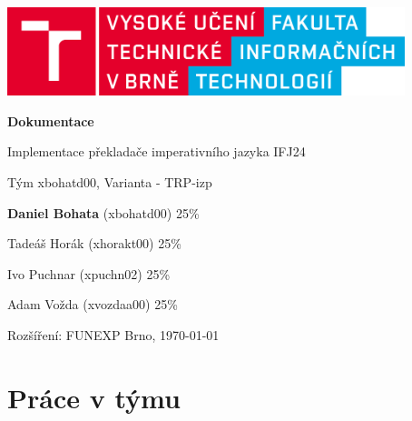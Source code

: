 \documentclass[a4paper, 12pt]{article}
\begin{document}
    \begin{titlepage}
        \begin{center}
            \includegraphics[width=0.87\textwidth]{images/logo_cz.png}
            \vspace*{6cm}

            \Huge{\textbf{Dokumentace}}
            \vspace{0.5cm}
            
            \LARGE{Implementace překladače imperativního jazyka IFJ24}
            \vspace{0.5cm}
            
            \Large{Tým xbohatd00, Varianta - TRP-izp}
            \vspace{2.5cm}
            
            \large{\textbf{Daniel Bohata} (xbohatd00) 25\%}
            \vspace{0.1cm}
            
            \large{Tadeáš Horák (xhorakt00) 25\%}
            \vspace{0.1cm}
            
            \large{Ivo Puchnar (xpuchn02) 25\%}
            \vspace{0.1cm}
            
            \large{Adam Vožda (xvozdaa00) 25\%}
            \vspace{0.1cm}
            
           \vfill
		   \begin{flushleft} 
		   \large
		   Rozšíření: FUNEXP
		   \hfill
		   Brno, \today
		   \end{flushleft}
        \end{center}
    \end{titlepage}

\pagestyle{fancy}

\newpage
\tableofcontents

\newpage
{}
\section{Práce v týmu}
\end{document}
